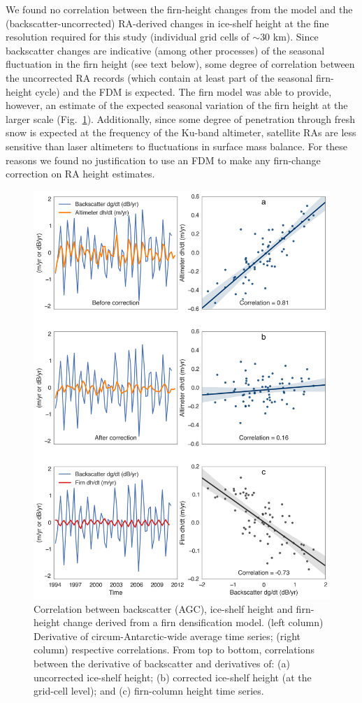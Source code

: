 We found no correlation between the firn-height changes from the model and the (backscatter-uncorrected) RA-derived changes in ice-shelf height at the fine resolution required for this study (individual grid cells of $\sim$30 km). Since backscatter changes are indicative (among other processes) of the seasonal fluctuation in the firn height (see text below), some degree of correlation between the uncorrected RA records (which contain at least part of the seasonal firn-height cycle) and the FDM is expected. The firn model was able to provide, however, an estimate of the expected seasonal variation of the firn height at the larger scale (Fig.~\ref{c2f5}). Additionally, since some degree of penetration through fresh snow is expected at the frequency of the Ku-band altimeter, satellite RAs are less sensitive than laser altimeters to fluctuations in surface mass balance. For these reasons we found no justification to use an FDM to make any firn-change correction on RA height estimates.


\begin{figure}[!ht]
  \centering
  \vspace{.4cm}
  \includegraphics[width=.85\textwidth]{img/correlation_h_b_f_v7.png}
  \caption[Correlation between backscatter and ice-shelf height]{
  Correlation between backscatter (AGC), ice-shelf height and firn-height change derived from a firn densification model. (left column) Derivative of circum-Antarctic-wide average time series; (right column) respective correlations. From top to bottom, correlations between the derivative of backscatter and derivatives of: (a) uncorrected ice-shelf height; (b) corrected ice-shelf height (at the grid-cell level); and (c) firn-column height time series.
  } 
  \label{c2f5}
\end{figure}

